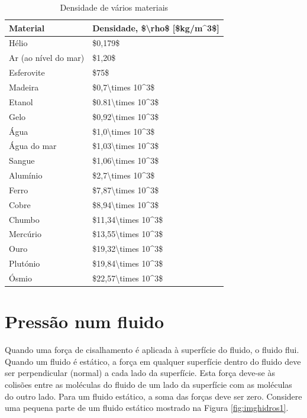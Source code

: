 \documentclass[
  portuguese,
  ]{book}
\begin{document}
\begin{table}

\caption{\label{tab:tab1} Densidade de vários materiais}
\centering
\begin{tabular}[t]{l|l}
\hline
Material & Densidade, \$\textbackslash{}rho\$ [\$kg/m\textasciicircum{}3\$]\\
\hline
Hélio & \$0,179\$\\
\hline
Ar (ao nível do mar) & \$1,20\$\\
\hline
Esferovite & \$75\$\\
\hline
Madeira & \$0,7\textbackslash{}times 10\textasciicircum{}3\$\\
\hline
Etanol & \$0.81\textbackslash{}times 10\textasciicircum{}3\$\\
\hline
Gelo & \$0,92\textbackslash{}times 10\textasciicircum{}3\$\\
\hline
Água & \$1,0\textbackslash{}times 10\textasciicircum{}3\$\\
\hline
Água do mar & \$1,03\textbackslash{}times 10\textasciicircum{}3\$\\
\hline
Sangue & \$1,06\textbackslash{}times 10\textasciicircum{}3\$\\
\hline
Alumínio & \$2,7\textbackslash{}times 10\textasciicircum{}3\$\\
\hline
Ferro & \$7,87\textbackslash{}times 10\textasciicircum{}3\$\\
\hline
Cobre & \$8,94\textbackslash{}times 10\textasciicircum{}3\$\\
\hline
Chumbo & \$11,34\textbackslash{}times 10\textasciicircum{}3\$\\
\hline
Mercúrio & \$13,55\textbackslash{}times 10\textasciicircum{}3\$\\
\hline
Ouro & \$19,32\textbackslash{}times 10\textasciicircum{}3\$\\
\hline
Plutónio & \$19,84\textbackslash{}times 10\textasciicircum{}3\$\\
\hline
Ósmio & \$22,57\textbackslash{}times 10\textasciicircum{}3\$\\
\hline
\end{tabular}
\end{table}

\hypertarget{pressuxe3o-num-fluido}{%
\section{Pressão num fluido}\label{pressuxe3o-num-fluido}}

Quando uma força de cisalhamento é aplicada à superfície do fluido, o fluido flui. Quando um fluido é estático, a força em qualquer superfície dentro do fluido deve ser perpendicular (normal) a cada lado da superfície. Esta força deve-se às colisões entre as moléculas do fluido de um lado da superfície com as moléculas do outro lado. Para um fluido estático, a soma das forças deve ser zero. Considere uma pequena parte de um fluido estático mostrado na Figura \ref{fig:imghidros1}.
\end{document}
